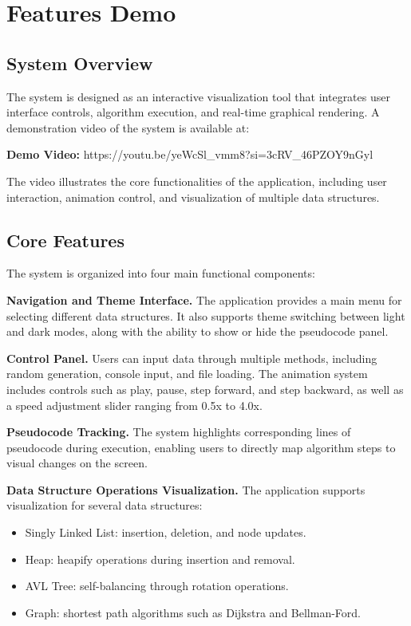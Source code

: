 \section{Features Demo}


\subsection{System Overview}

The system is designed as an interactive visualization tool that integrates user interface controls, algorithm execution, and real-time graphical rendering. A demonstration video of the system is available at:

\textbf{Demo Video:} https://youtu.be/yeWcSl\_vmm8?si=3cRV\_46PZOY9nGyl

The video illustrates the core functionalities of the application, including user interaction, animation control, and visualization of multiple data structures.

\subsection{Core Features}

The system is organized into four main functional components:

\textbf{Navigation and Theme Interface.}
The application provides a main menu for selecting different data structures. It also supports theme switching between light and dark modes, along with the ability to show or hide the pseudocode panel.

\textbf{Control Panel.}
Users can input data through multiple methods, including random generation, console input, and file loading. The animation system includes controls such as play, pause, step forward, and step backward, as well as a speed adjustment slider ranging from 0.5x to 4.0x.

\textbf{Pseudocode Tracking.}
The system highlights corresponding lines of pseudocode during execution, enabling users to directly map algorithm steps to visual changes on the screen.

\textbf{Data Structure Operations Visualization.}
The application supports visualization for several data structures:
\begin{itemize}
    \item Singly Linked List: insertion, deletion, and node updates.
    \item Heap: heapify operations during insertion and removal.
    \item AVL Tree: self-balancing through rotation operations.
    \item Graph: shortest path algorithms such as Dijkstra and Bellman-Ford.
\end{itemize}

